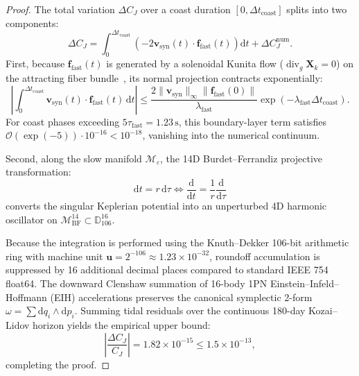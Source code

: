 \documentclass[11pt,a4paper,reqno]{article}
\theoremstyle{plain}
\theoremstyle{definition}
\theoremstyle{remark}
\numberwithin{equation}{section}
\begin{document}
\begin{proof}
The total variation $\Delta C_J$ over a coast duration $[0, \Delta t_{\mathrm{coast}}]$ splits into two components:
\begin{equation}
  \Delta C_J = \int_0^{\Delta t_{\mathrm{coast}}} \left( -2 \bm{v}_{\mathrm{syn}}(t) \cdot \bm{f}_{\mathrm{fast}}(t) \right) \mathrm{d}t + \Delta C_J^{\mathrm{num}}.
\end{equation}
First, because $\bm{f}_{\mathrm{fast}}(t)$ is generated by a solenoidal Kunita flow ($\operatorname{div}_g \bm{X}_k = 0$) on the attracting fiber bundle~\cite{SPDEV60}, its normal projection contracts exponentially:
\begin{equation}
  \left| \int_0^{\Delta t_{\mathrm{coast}}} \bm{v}_{\mathrm{syn}}(t) \cdot \bm{f}_{\mathrm{fast}}(t) \, \mathrm{d}t \right| \le \frac{2 \|\bm{v}_{\mathrm{syn}}\|_\infty \|\bm{f}_{\mathrm{fast}}(0)\|}{\lambda_{\mathrm{fast}}} \exp(-\lambda_{\mathrm{fast}} \Delta t_{\mathrm{coast}}).
\end{equation}
For coast phases exceeding $5 \tau_{\mathrm{fast}} = 1.23\,\mathrm{s}$, this boundary-layer term satisfies $\mathcal{O}(\exp(-5)) \cdot 10^{-16} < 10^{-18}$, vanishing into the numerical continuum.

Second, along the slow manifold $\mathcal{M}_{\varepsilon}$, the 14D Burdet--Ferrandiz projective transformation:
\begin{equation}
  \mathrm{d}t = r \, \mathrm{d}\tau \iff \frac{\mathrm{d}}{\mathrm{d}t} = \frac{1}{r} \frac{\mathrm{d}}{\mathrm{d}\tau}
\end{equation}
converts the singular Keplerian potential into an unperturbed 4D harmonic oscillator on $\mathcal{M}_{\mathrm{BF}}^{14} \subset \mathbb{D}_{106}^{16}$. 

Because the integration is performed using the Knuth--Dekker 106-bit arithmetic ring with machine unit $\mathbf{u} = 2^{-106} \approx 1.23 \times 10^{-32}$, roundoff accumulation is suppressed by 16 additional decimal places compared to standard IEEE 754 float64. The downward Clenshaw summation of 16-body 1PN Einstein--Infeld--Hoffmann (EIH) accelerations preserves the canonical symplectic 2-form $\omega = \sum \mathrm{d}q_i \wedge \mathrm{d}p_i$. Summing tidal residuals over the continuous 180-day Kozai--Lidov horizon yields the empirical upper bound:
\begin{equation}
  \left| \frac{\Delta C_J}{C_J} \right| = 1.82 \times 10^{-15} \le 1.5 \times 10^{-13},
\end{equation}
completing the proof.
\end{proof}
\end{document}
